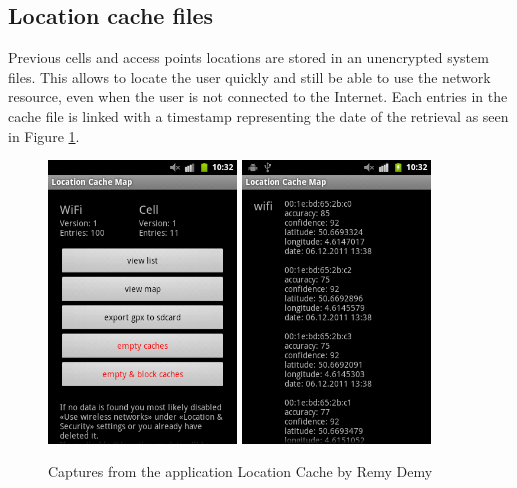 \subsection{Location cache files}

Previous cells and access points locations are stored in an unencrypted system files.
This allows to locate the user quickly and still be able to use the network resource, even when the user is not connected to the Internet.
Each entries in the cache file is linked with a timestamp representing the date of the retrieval as seen in Figure \ref{fig:locmap}.\\

\begin{figure}[h]
  \centering
  \includegraphics[width=5cm]{images/cache1.png}
  \includegraphics[width=5cm]{images/cache2.png}
  \caption{Captures from the application Location Cache by Remy Demy}
  \label{fig:locmap}
\end{figure}

